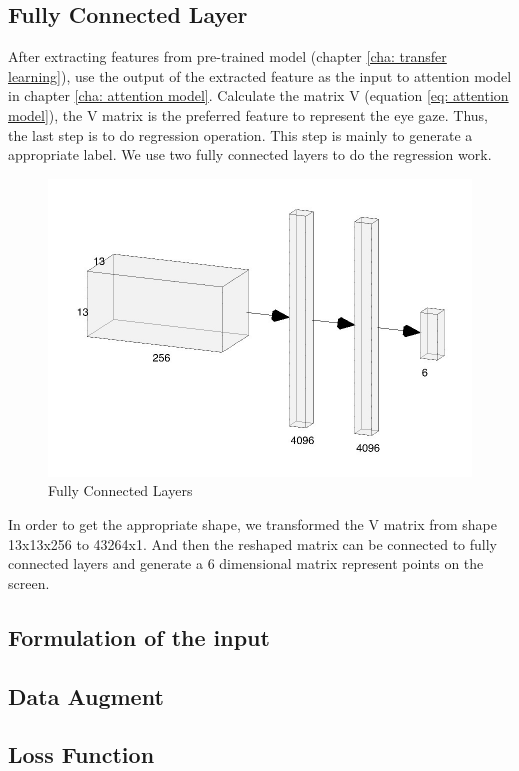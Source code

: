 \documentclass[senior]{IPSstyle}
\begin{document}
\subsection{Fully Connected Layer}\label{cha: fcn}
After extracting features from pre-trained model (chapter \ref{cha: transfer learning}), use the output of the extracted feature as the input to attention model in chapter \ref{cha: attention model}.
Calculate the matrix V (equation \ref{eq: attention model}), the V matrix is the preferred feature to represent the eye gaze.
Thus, the last step is to do regression operation.
This step is mainly to generate a appropriate label.
We use two fully connected layers to do the regression work.
\begin{figure}
    \centering
    \includegraphics[width=13cm]{MasterThesis-master/images/fcn.jpg}
    \caption{Fully Connected Layers}
    \label{fig:fcn}
\end{figure}
In order to get the appropriate shape, we transformed the V matrix from shape 13x13x256 to 43264x1.
And then the reshaped matrix can be connected to fully connected layers and generate a 6 dimensional matrix represent points on the screen.

\subsection{Formulation of the input}

\subsection{Data Augment}
\subsection{Loss Function}
\end{document}
